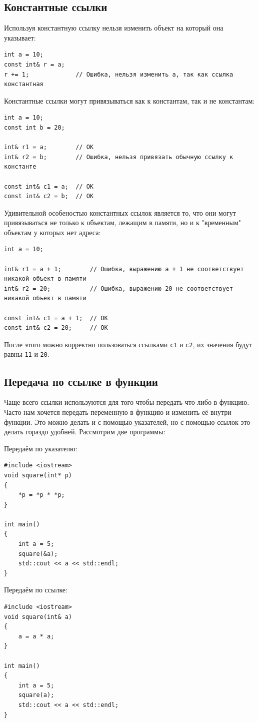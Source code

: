 \documentclass{article}
\begin{document}
\subsection*{Константные ссылки}
Используя константную ссылку нельзя изменить объект на который она указывает:
\begin{lstlisting}
int a = 10;
const int& r = a;
r += 1;             // Ошибка, нельзя изменить a, так как ссылка константная
\end{lstlisting}
Константные ссылки могут привязываться как к константам, так и не константам:
\begin{lstlisting}
int a = 10;
const int b = 20;
    
int& r1 = a;        // OK
int& r2 = b;        // Ошибка, нельзя привязать обычную ссылку к константе

const int& c1 = a;  // OK
const int& c2 = b;  // OK
\end{lstlisting}
Удивительной особеностью константных ссылок является то, что они могут привязываться не только к объектам, лежащим в памяти, но и к "временным"{} объектам у которых нет адреса:
\begin{lstlisting}
int a = 10;
    
int& r1 = a + 1;        // Ошибка, выражению a + 1 не соответствует никакой объект в памяти
int& r2 = 20;           // Ошибка, выражению 20 не соответствует никакой объект в памяти

const int& c1 = a + 1;  // OK
const int& c2 = 20;     // OK
\end{lstlisting}
После этого можно корректно пользоваться ссылками \texttt{c1} и \texttt{c2}, их значения будут равны \texttt{11} и \texttt{20}.

\subsection*{Передача по ссылке в функции}
Чаще всего ссылки используются для того чтобы передать что либо в функцию. Часто нам хочется передать переменную в функцию и изменить её внутри функции. Это можно делать и с помощью указателей, но с помощью ссылок это делать гораздо удобней. Рассмотрим две программы:

\begin{multicols}{2}
Передаём по указателю:
\begin{lstlisting}
#include <iostream>
void square(int* p)
{
    *p = *p * *p;
}

int main()
{
    int a = 5;
    square(&a);
    std::cout << a << std::endl;
}
\end{lstlisting}

Передаём по ссылке:
\begin{lstlisting}
#include <iostream>
void square(int& a)
{
    a = a * a;
}

int main()
{
    int a = 5;
    square(a);
    std::cout << a << std::endl;
}
\end{lstlisting}
\end{multicols}
\end{document}

